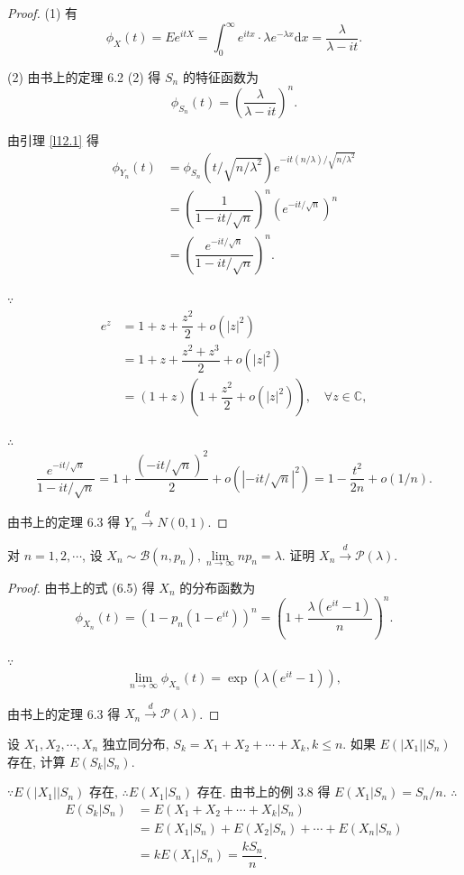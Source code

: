 \documentclass[color=black,device=normal,lang=cn]{elegantnote}
\numberwithin{equation}{section}
\theoremstyle{plain}
\numberwithin{exercise}{exsection}
\begin{document}
\begin{proof}
    (1) 有
    \[\phi_X(t)=Ee^{itX}=\int_0^\infty e^{itx}\cdot\lambda e^{-\lambda x}\mathrm{d}x=\dfrac{\lambda}{\lambda-it}.\]

    (2) 由书上的定理 6.2 (2) 得 $S_n$ 的特征函数为
    \[\phi_{S_n}(t)=\left(\dfrac{\lambda}{\lambda-it}\right)^n.\]

    由引理 \ref{l12.1} 得
    \begin{align*}
        \phi_{Y_n}(t) & =\phi_{S_n}(t/\sqrt{n/\lambda^2})e^{-it(n/\lambda)/\sqrt{n/\lambda^2}} \\
        & =\left(\dfrac{1}{1-it/\sqrt{n}}\right)^n(e^{-it/\sqrt{n}})^n \\
        & =\left(\dfrac{e^{-it/\sqrt{n}}}{1-it/\sqrt{n}}\right)^n.
    \end{align*}

    $\because$
    \begin{align*}
        e^z & =1+z+\dfrac{z^2}{2}+o(|z|^2) \\
        & =1+z+\dfrac{z^2+z^3}{2}+o(|z|^2) \\
        & =(1+z)\left(1+\dfrac{z^2}{2}+o(|z|^2)\right),\quad\forall z\in\mathbb{C},
    \end{align*}

    $\therefore$
    \[\dfrac{e^{-it/\sqrt{n}}}{1-it/\sqrt{n}}=1+\dfrac{(-it/\sqrt{n})^2}{2}+o(|-it/\sqrt{n}|^2)=1-\dfrac{t^2}{2n}+o(1/n).\]

    由书上的定理 6.3 得 $Y_n\xrightarrow{d}N(0,1)$.
\end{proof}
\addtocounter{exercise}{3}
\begin{exercise}%
    对 $n=1,2,\cdots$, 设 $X_n\sim\mathcal{B}(n,p_n),\lim\limits_{n\to\infty}np_n=\lambda$. 证明 $X_n\xrightarrow{d}\mathcal{P}(\lambda)$.
\end{exercise}
\begin{proof}
    由书上的式 (6.5) 得 $X_n$ 的分布函数为
    \[\phi_{X_n}(t)=(1-p_n(1-e^{it}))^n=\left(1+\dfrac{\lambda(e^{it}-1)}{n}\right)^n.\]

    $\because$
    \[\lim\limits_{n\to\infty}\phi_{X_n}(t)=\exp(\lambda(e^{it}-1)),\]

    由书上的定理 6.3 得 $X_n\xrightarrow{d}\mathcal{P}(\lambda)$.
\end{proof}
\begin{exercise}%
    设 $X_1,X_2,\cdots,X_n$ 独立同分布, $S_k=X_1+X_2+\cdots+X_k,k\leq n$. 如果 $E(|X_1|\big|S_n)$ 存在, 计算 $E(S_k|S_n)$.
\end{exercise}
\begin{solution}
    $\because E(|X_1|\big|S_n)$ 存在, $\therefore E(X_1\big|S_n)$ 存在. 由书上的例 3.8 得 $E(X_1\big|S_n)=S_n/n$. $\therefore$
    \begin{align*}
        E(S_k|S_n) & =E(X_1+X_2+\cdots+X_k|S_n) \\
        & =E(X_1\big|S_n)+E(X_2\big|S_n)+\cdots+E(X_n\big|S_n) \\
        & =kE(X_1\big|S_n)=\dfrac{kS_n}{n}.
    \end{align*}
\end{solution}
\end{document}
